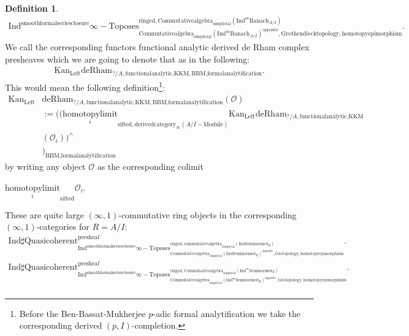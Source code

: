 \documentclass[11pt]{book}
\theoremstyle{definition}
\newtheorem{definition}[theorem]{Definition}
\numberwithin{equation}{section}
\begin{document}
\begin{definition}
\begin{align}
\mathrm{Ind}^\text{smoothformalseriesclosure}\infty-\mathrm{Toposes}^{\mathrm{ringed},\mathrm{Commutativealgebra}_{\mathrm{simplicial}}(\mathrm{Ind}^m\mathrm{Banach}_{A/I})}_{\mathrm{Commutativealgebra}_{\mathrm{simplicial}}(\mathrm{Ind}^m\mathrm{Banach}_{A/I})^\mathrm{opposite},\mathrm{Grothendiecktopology,homotopyepimorphism}}. 
\end{align}
We call the corresponding functors functional analytic derived de Rham complex presheaves which we are going to denote that as in the following:
\begin{align}
\mathrm{Kan}_{\mathrm{Left}}\mathrm{deRham}_{?/A,\text{functionalanalytic,KKM},\text{BBM,formalanalytification}}.	
\end{align}
This would mean the following definition{\footnote{Before the Ben-Bassat-Mukherjee $p$-adic formal analytification we take the corresponding derived $(p,I)$-completion.}}:
\begin{align}
\mathrm{Kan}_{\mathrm{Left}}&\mathrm{deRham}_{?/A,\text{functionalanalytic,KKM},\text{BBM,formalanalytification}}(\mathcal{O})\\
&:=	((\underset{i}{\text{homotopylimit}}_{\text{sifted},\text{derivedcategory}_{\infty}(A/I-\text{Module})}\mathrm{Kan}_{\mathrm{Left}}\mathrm{deRham}_{?/A,\text{functionalanalytic,KKM}}\\
&(\mathcal{O}_i))^\wedge\\
&)_\text{BBM,formalanalytification}
\end{align}
by writing any object $\mathcal{O}$ as the corresponding colimit 
\begin{center}
$\underset{i}{\text{homotopylimit}}_\text{sifted}\mathcal{O}_i$.
\end{center}
These are quite large $(\infty,1)$-commutative ring objects in the corresponding $(\infty,1)$-categories for $R=A/I$:
\begin{align}
\mathrm{Ind}\mathrm{\sharp Quasicoherent}^{\text{presheaf}}_{\mathrm{Ind}^\text{smoothformalseriesclosure}\infty-\mathrm{Toposes}^{\mathrm{ringed},\mathrm{commutativealgebra}_{\mathrm{simplicial}}(\mathrm{Ind}\mathrm{Seminormed}_R)}_{\mathrm{Commutativealgebra}_{\mathrm{simplicial}}(\mathrm{Ind}\mathrm{Seminormed}_R)^\mathrm{opposite},\mathrm{Grotopology,homotopyepimorphism}}}. \\
\mathrm{Ind}\mathrm{\sharp Quasicoherent}^{\text{presheaf}}_{\mathrm{Ind}^\text{smoothformalseriesclosure}\infty-\mathrm{Toposes}^{\mathrm{ringed},\mathrm{Commutativealgebra}_{\mathrm{simplicial}}(\mathrm{Ind}^m\mathrm{Seminormed}_R)}_{\mathrm{Commutativealgebra}_{\mathrm{simplicial}}(\mathrm{Ind}^m\mathrm{Seminormed}_R)^\mathrm{opposite},\mathrm{Grotopology,homotopyepimorphism}}}.\\

\end{align}
\end{definition}
\end{document}
